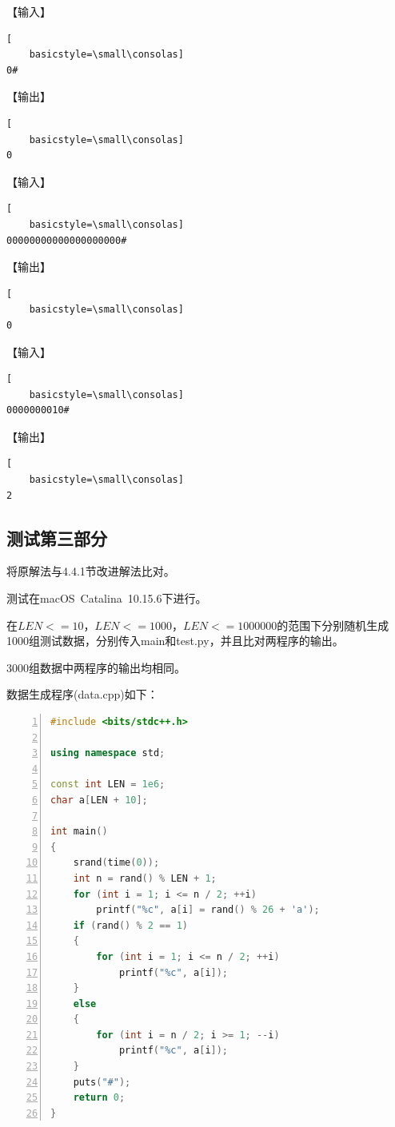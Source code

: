 \documentclass{article}
\begin{document}
【输入】

\begin{lstlisting}[
    basicstyle=\small\consolas]
0#
\end{lstlisting}

【输出】

\begin{lstlisting}[
    basicstyle=\small\consolas]
0
\end{lstlisting}

【输入】

\begin{lstlisting}[
    basicstyle=\small\consolas]
00000000000000000000#
\end{lstlisting}

【输出】

\begin{lstlisting}[
    basicstyle=\small\consolas]
0
\end{lstlisting}

【输入】

\begin{lstlisting}[
    basicstyle=\small\consolas]
0000000010#
\end{lstlisting}

【输出】

\begin{lstlisting}[
    basicstyle=\small\consolas]
2
\end{lstlisting}

\subsection{测试第三部分}

将原解法与4.4.1节改进解法比对。

测试在macOS\ Catalina\ 10.15.6下进行。

在$LEN<=10$，$LEN<=1000$，$LEN<=1000000$的范围下分别随机生成1000组测试数据，分别传入main和test.py，并且比对两程序的输出。

3000组数据中两程序的输出均相同。

数据生成程序(data.cpp)如下：

\begin{lstlisting}[language={C++},
    numbers=left,
    numberstyle=\tiny\consolas,
    basicstyle=\small\consolas]
#include <bits/stdc++.h>

using namespace std;

const int LEN = 1e6;
char a[LEN + 10];

int main()
{
    srand(time(0));
    int n = rand() % LEN + 1;
    for (int i = 1; i <= n / 2; ++i)
        printf("%c", a[i] = rand() % 26 + 'a');
    if (rand() % 2 == 1)
    {
        for (int i = 1; i <= n / 2; ++i)
            printf("%c", a[i]);
    }
    else
    {
        for (int i = n / 2; i >= 1; --i)
            printf("%c", a[i]);
    }
    puts("#");
    return 0;
}
\end{lstlisting}
\end{document}
